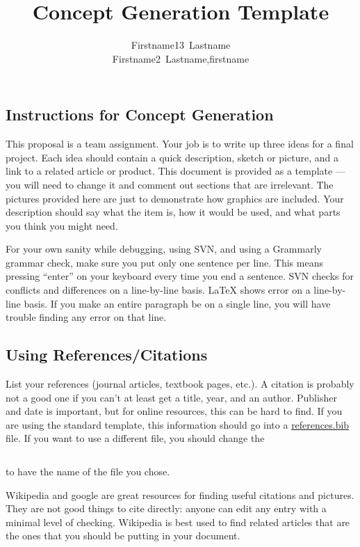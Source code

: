 \documentclass[draft]{rureport}
\author{Firstname13~Lastname\formatemail{email11}\\
  Firstname2~Lastname,firstname\formatemail{email12}}
\title{Concept Generation Template}  %
\begin{document}
\maketitle{}  %
\listoffixmes{}
\subsection*{Instructions for Concept Generation}
This proposal is a team assignment.
Your job is to write up three ideas for a final project.
Each idea should contain a quick description, sketch or picture, and a link to a related article or product.
This document is provided as a template --- you will need to change it and comment out sections that are irrelevant.
The pictures provided here are just to demonstrate how graphics are included.
Your description should say what the item is, how it would be used, and what parts you think you might need.

For your own sanity while debugging, using SVN, and using a Grammarly grammar check, make sure you put only one sentence per line.
This means pressing ``enter'' on your keyboard every time you end a sentence.
SVN checks for conflicts and differences on a line-by-line basis.
\LaTeX{} shows error on a line-by-line basis.
If you make an entire paragraph be on a single line, you will have trouble finding any error on that line.

\subsection*{Using References/Citations}
List your references (journal articles, textbook pages, etc.).
A citation is probably not a good one if you can't at least get a title, year, and an author.
Publisher and date is important, but for online resources, this can be hard to find.
If you are using the standard template, this information should go into a \url{references.bib} file.
If you want to use a different file, you should change the \begin{verbatim}\end{verbatim} to have the name of the  file you chose.

Wikipedia and google are great resources for finding useful citations and pictures.
They are not good things to cite directly: anyone can edit any entry with a minimal level of checking.
Wikipedia is best used to find related articles that are the ones that you should be putting in your document.
\end{document}
